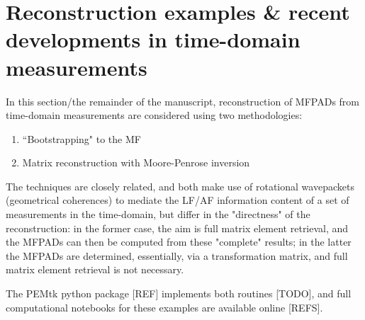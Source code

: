\section{Reconstruction examples \& recent developments in time-domain measurements}

In this section/the remainder of the manuscript, reconstruction of MFPADs from time-domain measurements are considered using two methodologies:

\begin{enumerate}
\item ``Bootstrapping" to the MF \cite{hockett2018QMP1,hockett2018QMP2,marceau2017MolecularFrameReconstruction}
\item Matrix reconstruction with Moore-Penrose inversion \cite{gregory2021MolecularFramePhotoelectron}
\end{enumerate}

The techniques are closely related, and both make use of rotational wavepackets (geometrical coherences) to mediate the LF/AF information content of a set of measurements in the time-domain, but differ in the "directness" of the reconstruction: in the former case, the aim is full matrix element retrieval, and the MFPADs can then be computed from these "complete" results; in the latter the MFPADs are determined, essentially, via a transformation matrix, and full matrix element retrieval is not necessary. 

The PEMtk python package [REF] implements both routines [TODO], and full computational notebooks for these examples are available online [REFS].